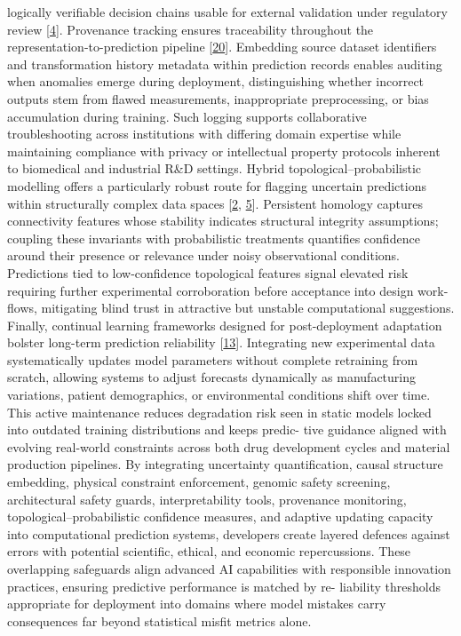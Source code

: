 \documentclass[
]{article}
\begin{document}
logically verifiable decision chains usable for external validation
under regulatory review {[}\hyperref[_bookmark44]{4}{]}. Provenance
tracking ensures traceability throughout the
representation-to-prediction pipeline {[}\hyperref[_bookmark60]{20}{]}.
Embedding source dataset identifiers and transformation history metadata
within prediction records enables auditing when anomalies emerge during
deployment, distinguishing whether incorrect outputs stem from flawed
measurements, inappropriate preprocessing, or bias accumulation during
training. Such logging supports collaborative troubleshooting across
institutions with differing domain expertise while maintaining
compliance with privacy or intellectual property protocols inherent to
biomedical and industrial R\&D settings. Hybrid
topological--probabilistic modelling offers a particularly robust route
for flagging uncertain predictions within structurally complex data
spaces {[}\hyperref[_bookmark42]{2}, \hyperref[_bookmark45]{5}{]}.
Persistent homology captures connectivity features whose stability
indicates structural integrity assumptions; coupling these invariants
with probabilistic treatments quantifies confidence around their
presence or relevance under noisy observational conditions. Predictions
tied to low-confidence topological features signal elevated risk
requiring further experimental corroboration before acceptance into
design work- flows, mitigating blind trust in attractive but unstable
computational suggestions. Finally, continual learning frameworks
designed for post-deployment adaptation bolster long-term prediction
reliability {[}\hyperref[_bookmark53]{13}{]}. Integrating new
experimental data systematically updates model parameters without
complete retraining from scratch, allowing systems to adjust forecasts
dynamically as manufacturing variations, patient demographics, or
environmental conditions shift over time. This active maintenance
reduces degradation risk seen in static models locked into outdated
training distributions and keeps predic- tive guidance aligned with
evolving real-world constraints across both drug development cycles and
material production pipelines. By integrating uncertainty
quantification, causal structure embedding, physical constraint
enforcement, genomic safety screening, architectural safety guards,
interpretability tools, provenance monitoring,
topological--probabilistic confidence measures, and adaptive updating
capacity into computational prediction systems, developers create
layered defences against errors with potential scientific, ethical, and
economic repercussions. These overlapping safeguards align advanced AI
capabilities with responsible innovation practices, ensuring predictive
performance is matched by re- liability thresholds appropriate for
deployment into domains where model mistakes carry consequences far
beyond statistical misfit metrics alone.
\end{document}
